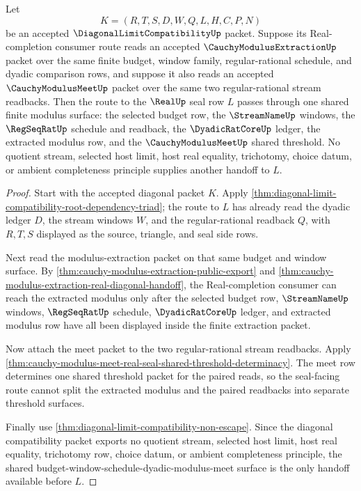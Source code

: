\begin{theorem}
\label{thm:diagonal-limit-compatibility-modulus-extraction-meet-handoff}
Let
$$
K=(R,T,S,D,W,Q,L,H,C,P,N)
$$
be an accepted $\DiagonalLimitCompatibilityUp$ packet. Suppose its
Real-completion consumer route reads an accepted
$\CauchyModulusExtractionUp$ packet over the same finite budget, window
family, regular-rational schedule, and dyadic comparison rows, and suppose it
also reads an accepted $\CauchyModulusMeetUp$ packet over the same two
regular-rational stream readbacks. Then the route to the $\RealUp$ seal row
$L$ passes through one shared finite modulus surface: the selected budget row,
the $\StreamNameUp$ windows, the $\RegSeqRatUp$ schedule and readback, the
$\DyadicRatCoreUp$ ledger, the extracted modulus row, and the
$\CauchyModulusMeetUp$ shared threshold. No quotient stream, selected host
limit, host real equality, trichotomy, choice datum, or ambient completeness
principle supplies another handoff to $L$.
\end{theorem}
\begin{proof}
Start with the accepted diagonal packet $K$. Apply
\autoref{thm:diagonal-limit-compatibility-root-dependency-triad}; the route to
$L$ has already read the dyadic ledger $D$, the stream windows $W$, and the
regular-rational readback $Q$, with $R,T,S$ displayed as the source, triangle,
and seal side rows.

Next read the modulus-extraction packet on that same budget and window
surface. By \autoref{thm:cauchy-modulus-extraction-public-export} and
\autoref{thm:cauchy-modulus-extraction-real-diagonal-handoff}, the
Real-completion consumer can reach the extracted modulus only after the
selected budget row, $\StreamNameUp$ windows, $\RegSeqRatUp$ schedule,
$\DyadicRatCoreUp$ ledger, and extracted modulus row have all been displayed
inside the finite extraction packet.

Now attach the meet packet to the two regular-rational stream readbacks. Apply
\autoref{thm:cauchy-modulus-meet-real-seal-shared-threshold-determinacy}. The
meet row determines one shared threshold packet for the paired reads, so the
seal-facing route cannot split the extracted modulus and the paired readbacks
into separate threshold surfaces.

Finally use \autoref{thm:diagonal-limit-compatibility-non-escape}. Since the
diagonal compatibility packet exports no quotient stream, selected host limit,
host real equality, trichotomy row, choice datum, or ambient completeness
principle, the shared budget-window-schedule-dyadic-modulus-meet surface is
the only handoff available before $L$.
\end{proof}

